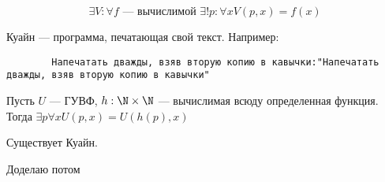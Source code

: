 \begin{theorem}[Фридберга]
    \[\exists V: \forall f\text{ --- вычислимой } \exists ! p: \forall x V(p, x) = f(x)\]
\end{theorem}

\begin{definition}
    Куайн --- программа, печатающая свой текст. Например:
    \begin{verbatim}
        Напечатать дважды, взяв вторую копию в кавычки:"Напечатать дважды, взяв вторую копию в кавычки"
    \end{verbatim}
\end{definition}

\begin{theorem}
    Пусть \(U\) --- ГУВФ, \(h: \N \times \N\) --- вычислимая всюду определенная функция. Тогда \(\exists p \forall x U(p, x) = U(h(p), x)\)
\end{theorem}

\begin{corollary}
    Существует Куайн.
\end{corollary}

Доделаю потом